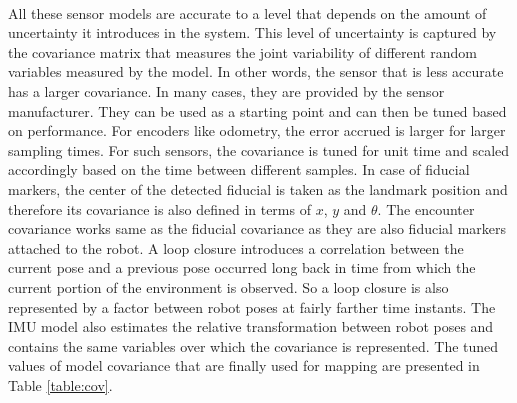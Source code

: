 \paragraph{}
All these sensor models are accurate to a level that depends on the amount of uncertainty it introduces in the system. This level of uncertainty is captured by the covariance matrix that measures the joint variability of different random variables measured by the model. In other words, the sensor that is less accurate has a larger covariance. In many cases, they are provided by the sensor manufacturer. They can be used as a starting point and can then be tuned based on performance. For encoders like odometry, the error accrued is larger for larger sampling times. For such sensors, the covariance is tuned for unit time and scaled accordingly based on the time between different samples. In case of fiducial markers, the center of the detected fiducial is taken as the landmark position and therefore its covariance is also defined in terms of $x$, $y$ and $\theta$. The encounter covariance works same as the fiducial covariance as they are also fiducial markers attached to the robot. A loop closure introduces a correlation between the current pose and a previous pose occurred long back in time from which the current portion of the environment is observed. So a loop closure is also represented by a factor between robot poses at fairly farther time instants. The IMU model also estimates the relative transformation between robot poses and contains the same variables over which the covariance is represented. The tuned values of model covariance that are finally used for mapping are presented in Table \ref{table:cov}.
